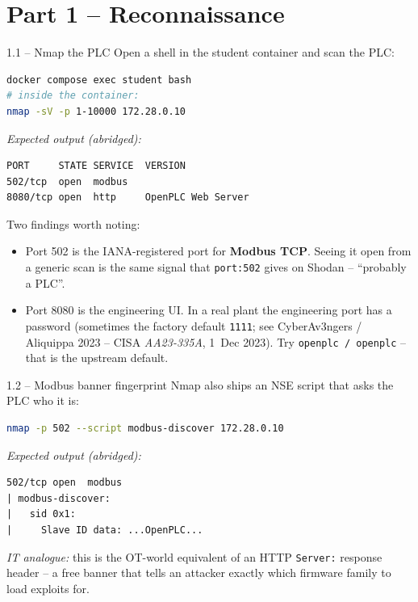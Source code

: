 \documentclass[11pt,a4paper]{article}
\begin{document}
\section*{Part 1 -- Reconnaissance}

\begin{stepbox}{1.1 -- Nmap the PLC}
Open a shell in the student container and scan the PLC:
\begin{lstlisting}[language=bash]
docker compose exec student bash
# inside the container:
nmap -sV -p 1-10000 172.28.0.10
\end{lstlisting}
\textit{Expected output (abridged):}
\begin{lstlisting}
PORT     STATE SERVICE  VERSION
502/tcp  open  modbus
8080/tcp open  http     OpenPLC Web Server
\end{lstlisting}
Two findings worth noting:
\begin{itemize}\setlength{\itemsep}{1pt}
  \item Port 502 is the IANA-registered port for \textbf{Modbus TCP}.
        Seeing it open from a generic scan is the same signal that
        \texttt{port:502} gives on Shodan -- ``probably a PLC''.
  \item Port 8080 is the engineering UI. In a real plant the
        engineering port has a password (sometimes the factory
        default \texttt{1111}; see CyberAv3ngers / Aliquippa
        2023 -- CISA \emph{AA23-335A}, 1~Dec 2023). Try
        \texttt{openplc / openplc} -- that is the upstream default.
\end{itemize}
\end{stepbox}

\begin{stepbox}{1.2 -- Modbus banner fingerprint}
Nmap also ships an NSE script that asks the PLC who it is:
\begin{lstlisting}[language=bash]
nmap -p 502 --script modbus-discover 172.28.0.10
\end{lstlisting}
\textit{Expected output (abridged):}
\begin{lstlisting}
502/tcp open  modbus
| modbus-discover:
|   sid 0x1:
|     Slave ID data: ...OpenPLC...
\end{lstlisting}
\emph{IT analogue:} this is the OT-world equivalent of an HTTP
\texttt{Server:} response header -- a free banner that tells an
attacker exactly which firmware family to load exploits for.
\end{stepbox}

\end{document}
